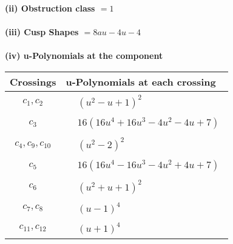 \documentclass[1p]{elsarticle_modified}
\theoremstyle{definition}
\begin{document}
\flushleft \textbf{(ii) Obstruction class $= 1$}\\~\\
\flushleft \textbf{(iii) Cusp Shapes $= 8 a u-4 u-4$}\\~\\
\newpage\renewcommand{\arraystretch}{1}
\flushleft \textbf{(iv) u-Polynomials at the component}\newline \\
\begin{tabular}{m{50pt}|m{274pt}}
Crossings & \hspace{64pt}u-Polynomials at each crossing \\
\hline $$\begin{aligned}c_{1},c_{2}\end{aligned}$$&$\begin{aligned}
&(u^2- u+1)^2
\end{aligned}$\\
\hline $$\begin{aligned}c_{3}\end{aligned}$$&$\begin{aligned}
&16(16 u^4+16 u^3-4 u^2-4 u+7)
\end{aligned}$\\
\hline $$\begin{aligned}c_{4},c_{9},c_{10}\end{aligned}$$&$\begin{aligned}
&(u^2-2)^2
\end{aligned}$\\
\hline $$\begin{aligned}c_{5}\end{aligned}$$&$\begin{aligned}
&16(16 u^4-16 u^3-4 u^2+4 u+7)
\end{aligned}$\\
\hline $$\begin{aligned}c_{6}\end{aligned}$$&$\begin{aligned}
&(u^2+u+1)^2
\end{aligned}$\\
\hline $$\begin{aligned}c_{7},c_{8}\end{aligned}$$&$\begin{aligned}
&(u-1)^4
\end{aligned}$\\
\hline $$\begin{aligned}c_{11},c_{12}\end{aligned}$$&$\begin{aligned}
&(u+1)^4
\end{aligned}$\\
\hline
\end{tabular}\\~\\
\end{document}
